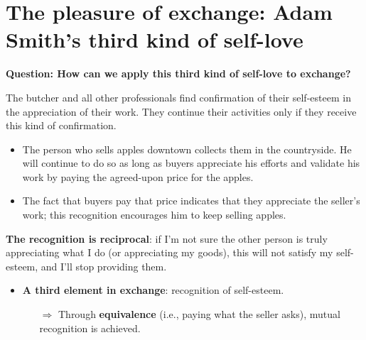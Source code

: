 \section[The Pleasure of Exchange]{The pleasure of exchange: Adam Smith’s third kind of self-love}

\textbf{Question: How can we apply this third kind of self-love to exchange?}

The butcher and all other professionals find confirmation of their self-esteem in the appreciation of their work. They continue their activities only if they receive this kind of confirmation.

\begin{itemize}
    \item The person who sells apples downtown collects them in the countryside. He will continue to do so as long as buyers appreciate his efforts and validate his work by paying the agreed-upon price for the apples.
    \item The fact that buyers pay that price indicates that they appreciate the seller’s work; this recognition encourages him to keep selling apples.
\end{itemize}

\textbf{The recognition is reciprocal}: if I’m not sure the other person is truly appreciating what I do (or appreciating my goods), this will not satisfy my self-esteem, and I’ll stop providing them.

\begin{itemize}
    \item \textbf{A third element in exchange}: recognition of self-esteem.
        \begin{itemize}
            \item[\(\Rightarrow\)] Through \textbf{equivalence} (i.e., paying what the seller asks), mutual recognition is achieved.
        \end{itemize}
\end{itemize}

